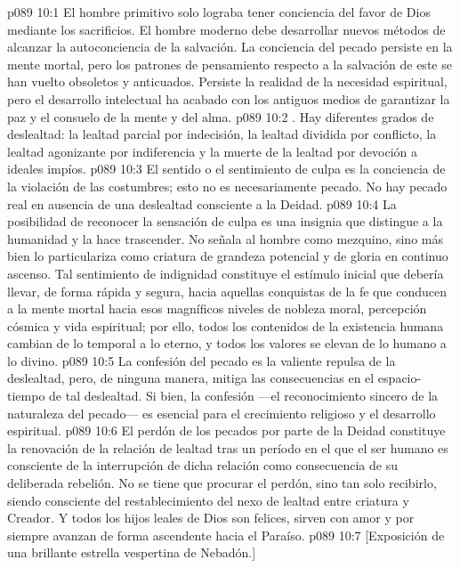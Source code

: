 \vs p089 10:1 El hombre primitivo solo lograba tener conciencia del favor de Dios mediante los sacrificios. El hombre moderno debe desarrollar nuevos métodos de alcanzar la autoconciencia de la salvación. La conciencia del pecado persiste en la mente mortal, pero los patrones de pensamiento respecto a la salvación de este se han vuelto obsoletos y anticuados. Persiste la realidad de la necesidad espiritual, pero el desarrollo intelectual ha acabado con los antiguos medios de garantizar la paz y el consuelo de la mente y del alma.
\vs p089 10:2 \pc {}. Hay diferentes grados de deslealtad: la lealtad parcial por indecisión, la lealtad dividida por conflicto, la lealtad agonizante por indiferencia y la muerte de la lealtad por devoción a ideales impíos.
\vs p089 10:3 \pc El sentido o el sentimiento de culpa es la conciencia de la violación de las costumbres; esto no es necesariamente pecado. No hay pecado real en ausencia de una deslealtad consciente a la Deidad.
\vs p089 10:4 La posibilidad de reconocer la sensación de culpa es una insignia que distingue a la humanidad y la hace trascender. No señala al hombre como mezquino, sino más bien lo particulariza como criatura de grandeza potencial y de gloria en continuo ascenso. Tal sentimiento de indignidad constituye el estímulo inicial que debería llevar, de forma rápida y segura, hacia aquellas conquistas de la fe que conducen a la mente mortal hacia esos magníficos niveles de nobleza moral, percepción cósmica y vida espiritual; por ello, todos los contenidos de la existencia humana cambian de lo temporal a lo eterno, y todos los valores se elevan de lo humano a lo divino.
\vs p089 10:5 La confesión del pecado es la valiente repulsa de la deslealtad, pero, de ninguna manera, mitiga las consecuencias en el espacio\hyp{}tiempo de tal deslealtad. Si bien, la confesión ---el reconocimiento sincero de la naturaleza del pecado--- es esencial para el crecimiento religioso y el desarrollo espiritual.
\vs p089 10:6 El perdón de los pecados por parte de la Deidad constituye la renovación de la relación de lealtad tras un período en el que el ser humano es consciente de la interrupción de dicha relación como consecuencia de su deliberada rebelión. No se tiene que procurar el perdón, sino tan solo recibirlo, siendo consciente del restablecimiento del nexo de lealtad entre criatura y Creador. Y todos los hijos leales de Dios son felices, sirven con amor y por siempre avanzan de forma ascendente hacia el Paraíso.
\vsetoff
\vs p089 10:7 [Exposición de una brillante estrella vespertina de Nebadón.]
